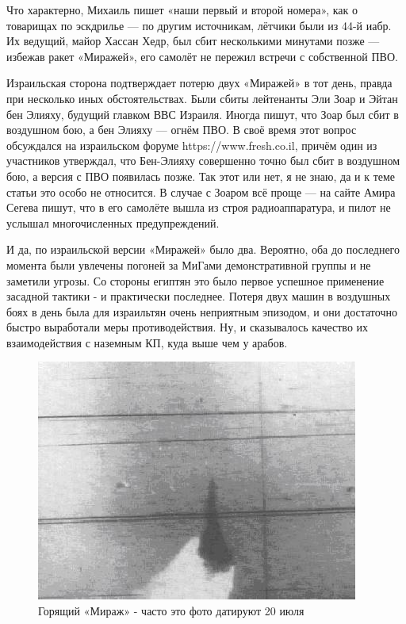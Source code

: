 Что характерно, Михаиль пишет «наши первый и второй номера», как о товарищах по эскдрилье — по другим источникам, лётчики были из 44-й иабр. Их ведущий, майор Хассан Хедр, был сбит несколькими минутами позже — избежав ракет «Миражей», его самолёт не пережил встречи с собственной ПВО.

Израильская сторона подтверждает потерю двух «Миражей» в тот день, правда при несколько иных обстоятельствах. Были сбиты лейтенанты Эли Зоар и Эйтан бен Элияху, будущий главком ВВС Израиля. Иногда пишут, что Зоар был сбит в воздушном бою, а бен Элияху — огнём ПВО. В своё время этот вопрос обсуждался на израильском форуме https://www.fresh.co.il, причём один из участников утверждал, что Бен-Элияху совершенно точно был сбит в воздушном бою, а версия с ПВО появилась позже. Так этот или нет, я не знаю, да и к теме статьи это особо не относится. В случае с Зоаром всё проще — на сайте Амира Сегева пишут, что в его самолёте вышла из строя радиоаппаратура, и пилот не услышал многочисленных предупреждений.

И да, по израильской версии «Миражей» было два. Вероятно, оба до последнего момента были увлечены погоней за МиГами демонстративной группы и не заметили угрозы. Со стороны египтян это было первое успешное применение засадной тактики - и практически последнее. Потеря двух машин в воздушных боях в день была для израильтян очень неприятным эпизодом, и они достаточно быстро выработали меры противодействия. Ну, и сказывалось качество их взаимодействия с наземным КП, куда выше чем у арабов.

\begin{figure}[h!tb] 
	\centering\includegraphics[scale=0.9]{History_Fenix/4syfS9htP7E.jpg}
	\caption{Горящий «Мираж» - часто это фото датируют 20 июля}%
\end{figure}

